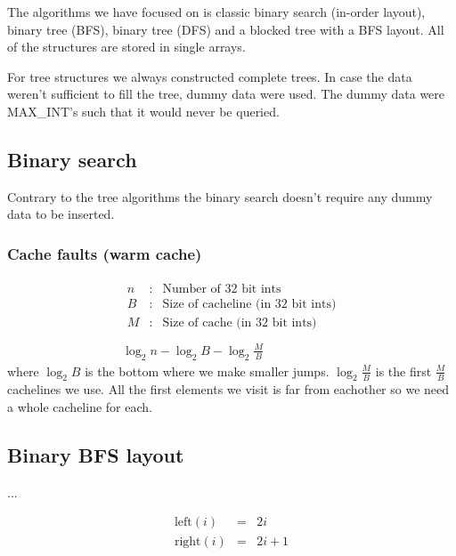 The algorithms we have focused on is classic binary search (in-order layout), binary tree (BFS), binary tree (DFS) and a blocked tree with a BFS layout. All of the structures are stored in single arrays.


For tree structures we always constructed complete trees. In case the data weren't sufficient to fill the tree, dummy data were used. The dummy data were MAX\_INT's such that it would never be queried.


\subsection{Binary search}

Contrary to the tree algorithms the binary search doesn't require any dummy data to be inserted.

\subsubsection*{Cache faults (warm cache)}

\begin{eqnarray*}
\begin{array}{rcl}
n & : & \textrm{Number of 32 bit ints} \\
B & : & \textrm{Size of cacheline (in 32 bit ints)} \\
M & : & \textrm{Size of cache (in 32 bit ints)}
\end{array}
\\
\\
\log_2 n - \log_2 B - \log_2 \frac{M}{B} 
\end{eqnarray*}
where $\log_2 B$ is the bottom where we make smaller jumps. $\log_2 \frac{M}{B}$ is the first $\frac{M}{B}$ cachelines we use. All the first elements we visit is far from eachother so we need a whole cacheline for each.


\subsection{Binary BFS layout}

...

\begin{eqnarray*}
\mathrm{left}(i) & = & 2i \\
\mathrm{right}(i) & = & 2i + 1
\end{eqnarray*}

